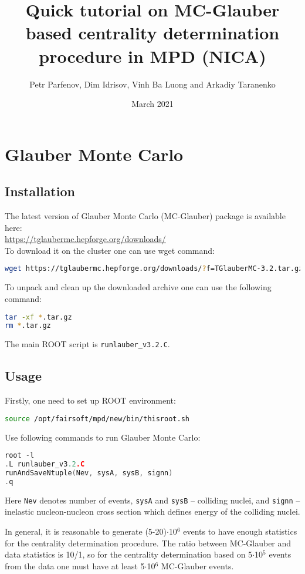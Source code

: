 \documentclass[11pt]{article}
\title{Quick tutorial on MC-Glauber based centrality determination procedure in MPD (NICA)}
\author{Petr Parfenov, Dim Idrisov, Vinh Ba Luong and Arkadiy Taranenko}
\date{March 2021}
\begin{document}
\maketitle

\section{Glauber Monte Carlo}

\subsection{Installation}
The latest version of Glauber Monte Carlo (MC-Glauber) package is available here:\\
\url{https://tglaubermc.hepforge.org/downloads/}\\
%
To download it on the cluster one can use wget command:
\begin{lstlisting}[language=bash,caption={}]
wget https://tglaubermc.hepforge.org/downloads/?f=TGlauberMC-3.2.tar.gz
\end{lstlisting}
%
To unpack and clean up the downloaded archive one can use the following command:
\begin{lstlisting}[language=bash,caption={}]
tar -xf *.tar.gz
rm *.tar.gz
\end{lstlisting}
%
The main ROOT script is \texttt{runlauber\_v3.2.C}.

\subsection{Usage}

Firstly, one need to set up ROOT environment:
\begin{lstlisting}[language=bash,caption={}]
source /opt/fairsoft/mpd/new/bin/thisroot.sh
\end{lstlisting}
%
Use following commands to run Glauber Monte Carlo:
\begin{lstlisting}[language=C++,caption={}]
root -l
.L runlauber_v3.2.C
runAndSaveNtuple(Nev, sysA, sysB, signn)
.q
\end{lstlisting}
%
Here \texttt{Nev} denotes number of events, \texttt{sysA} and \texttt{sysB} -- colliding nuclei, and \texttt{signn} -- inelastic nucleon-nucleon cross section which defines energy of the colliding nuclei.

In general, it is reasonable to generate (5-20)$\cdot$10$^{6}$ events to have enough statistics for the centrality determination procedure. The ratio between MC-Glauber and data statistics is 10/1, so for the centrality determination based on 5$\cdot$10$^{5}$ events from the data one must have at least 5$\cdot$10$^{6}$ MC-Glauber events.
\end{document}

